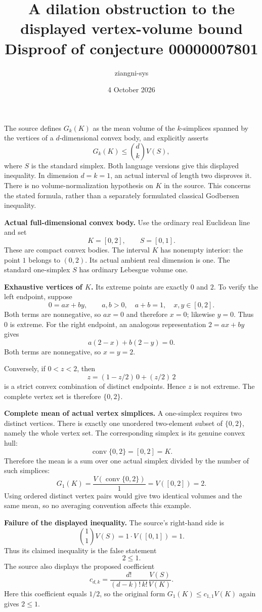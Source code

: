 \documentclass[11pt,a4paper]{article}
\title{A dilation obstruction to the displayed vertex-volume bound\\
\large Disproof of conjecture 00000007801}
\author{ziangni-sys}
\date{4 October 2026}
\begin{document}
\maketitle
The source defines $G_k(K)$ as the mean volume of the
$k$-simplices spanned by the vertices of a $d$-dimensional convex
body, and explicitly asserts
\[
 G_k(K)\leq\binom dk V(S),
\]
where $S$ is the standard simplex.
Both language versions give this displayed inequality.
In dimension $d=k=1$, an actual interval of length two disproves it.
There is no volume-normalization hypothesis on $K$ in the source.
This concerns the stated formula, rather than a separately
formulated classical Godbersen inequality.

\textbf{Actual full-dimensional convex body.}
Use the ordinary real Euclidean line and set
\[
 K=[0,2],\qquad S=[0,1].
\]
These are compact convex bodies. The interval $K$ has nonempty
interior: the point $1$ belongs to $(0,2)$.
Its actual ambient real dimension is one.
The standard one-simplex $S$ has ordinary Lebesgue volume one.

\textbf{Exhaustive vertices of $K$.}
Its extreme points are exactly $0$ and $2$.
To verify the left endpoint, suppose
\[
 0=ax+by,\qquad a,b>0,\quad a+b=1,\quad x,y\in[0,2].
\]
Both terms are nonnegative, so $ax=0$ and therefore $x=0$;
likewise $y=0$. Thus $0$ is extreme.
For the right endpoint, an analogous representation
$2=ax+by$ gives
\[
 a(2-x)+b(2-y)=0.
\]
Both terms are nonnegative, so $x=y=2$.

Conversely, if $0<z<2$, then
\[
 z=(1-z/2)\,0+(z/2)\,2
\]
is a strict convex combination of distinct endpoints.
Hence $z$ is not extreme.
The complete vertex set is therefore $\{0,2\}$.

\newpage
\textbf{Complete mean of actual vertex simplices.}
A one-simplex requires two distinct vertices. There is exactly
one unordered two-element subset of $\{0,2\}$, namely the
whole vertex set.
The corresponding simplex is its genuine convex hull:
\[
 \operatorname{conv}\{0,2\}=[0,2]=K.
\]
Therefore the mean is a sum over one actual simplex divided by
the number of such simplices:
\[
 G_1(K)=\frac{V(\operatorname{conv}\{0,2\})}{1}
       =V([0,2])=2.
\]
Using ordered distinct vertex pairs would give two identical
volumes and the same mean, so no averaging convention affects
this example.

\textbf{Failure of the displayed inequality.}
The source's right-hand side is
\[
 \binom11V(S)=1\cdot V([0,1])=1.
\]
Thus its claimed inequality is the false statement
\[
 2\leq1.
\]
The source also displays the proposed coefficient
\[
 c_{d,k}=\frac{d!}{(d-k)!\,k!}\frac{V(S)}{V(K)}.
\]
Here this coefficient equals $1/2$, so the original form
$G_1(K)\leq c_{1,1}V(K)$ again gives $2\leq1$.
\end{document}
